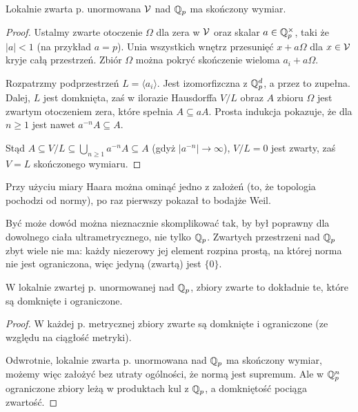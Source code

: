 \begin{fakt}
	Lokalnie  zwarta p. unormowana $\mathcal V$ nad $\mathbb Q_p$ ma skończony wymiar.
\end{fakt}

\begin{proof}
	Ustalmy zwarte otoczenie $\Omega$ dla zera w $\mathcal V$ oraz skalar $a \in \mathbb Q_p^\times$, taki że $|a| < 1$ (na przykład $a = p$).
	Unia wszystkich wnętrz przesunięć $x + a \Omega$ dla $x \in \mathcal V$ kryje całą przestrzeń.
	Zbiór $\Omega$ można pokryć skończenie wieloma $a_i + a\Omega$.

	Rozpatrzmy podprzestrzeń $L = \langle a_i \rangle$.
	Jest izomorfizczna z $\mathbb Q_p^d$, a przez to zupełna.
	Dalej, $L$ jest domknięta, zaś w ilorazie Hausdorffa $V/L$ obraz $A$ zbioru $\Omega$ jest zwartym otoczeniem zera, które spełnia $A \subseteq aA$.
	Prosta indukcja pokazuje, że dla $n \ge 1$ jest nawet $a^{-n} A \subseteq A$.

	Stąd $A \subseteq V/L \subseteq \bigcup_{n \ge 1} a^{-n} A \subseteq A$ (gdyż $|a^{-n}| \to \infty$), $V/L = 0$ jest zwarty, zaś $V = L$ skończonego wymiaru.
\end{proof}

Przy użyciu miary Haara można ominąć jedno z założeń (to, że topologia pochodzi od normy), po raz pierwszy pokazał to bodajże Weil.

Być może dowód można nieznacznie skomplikować tak, by był poprawny dla dowolnego ciała ultrametrycznego, nie tylko $\mathbb Q_p$.
Zwartych przestrzeni nad $\mathbb Q_p$ zbyt wiele nie ma: każdy niezerowy jej element rozpina prostą, na której norma nie jest ograniczona, więc jedyną (zwartą) jest $\{0\}$.

\begin{wniosek}
	W lokalnie zwartej p. unormowanej nad $\mathbb Q_p$, zbiory zwarte to dokładnie te, które są domknięte i ograniczone.
\end{wniosek}

\begin{proof}
	W każdej p. metrycznej zbiory zwarte są domknięte i ograniczone (ze względu na ciągłość metryki).

	Odwrotnie, lokalnie zwarta p. unormowana nad $\mathbb Q_p$ ma skończony wymiar, możemy więc założyć bez utraty ogólności, że normą jest supremum.
	Ale w $\mathbb Q_p^n$ ograniczone zbiory leżą w produktach kul z $\mathbb Q_p$, a domkniętość pociąga zwartość.
\end{proof}
